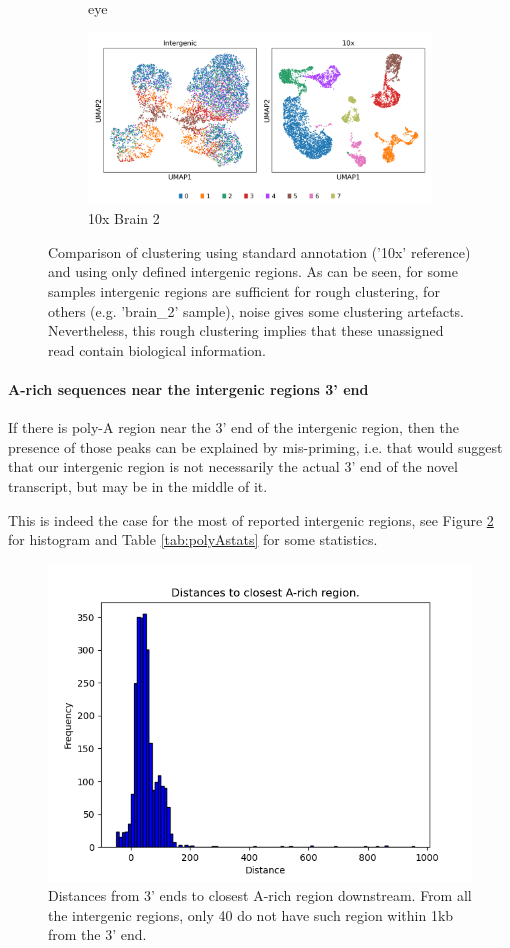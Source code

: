 \begin{figure}[htbp]
\begin{subfigure}{0.45\textwidth}
        \caption{eye}
    \end{subfigure}
    \hfill
    \begin{subfigure}{0.45\textwidth}
        \centering
        \includegraphics[width=\textwidth]{images/umaps/intergenic_10x_brain_2.png}
        \caption{10x Brain 2}
    \end{subfigure}
    \caption{Comparison of clustering using standard annotation ('10x' reference) and using only defined intergenic regions.
    As can be seen, for some samples intergenic regions are sufficient for rough clustering, for others (e.g. 'brain\_2' sample), 
    noise gives some clustering artefacts.
    Nevertheless, this rough clustering implies that these unassigned read contain biological information.}
    \label{fig:intergenicClustering}
\end{figure}

\paragraph{A-rich sequences near the intergenic regions 3' end}

If there is poly-A region near the 3' end of the intergenic region, then the presence of those peaks can be explained by mis-priming,
i.e. that would suggest that our intergenic region is not necessarily the actual 3' end of the novel transcript, but may be in the middle of it.

This is indeed the case for the most of reported intergenic regions,
see Figure \ref{fig:polyAdistances} for histogram and Table \ref{tab:polyAstats} for some statistics.

\begin{figure}
  \centering
  \includegraphics[width=0.5\linewidth]{images/poly-A-distances.png}
  \caption{Distances from 3' ends to closest A-rich region downstream.
  From all the intergenic regions, only 40 do not have such region within 1kb from the 3' end.}
  \label{fig:polyAdistances}
\end{figure}


